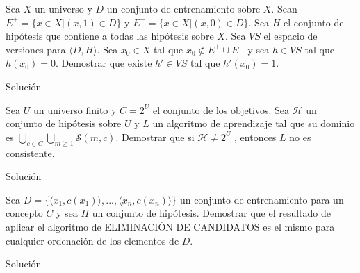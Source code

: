 \documentclass{mulcia_aa}
\begin{document}
\genTitle

\begin{problem}
Sea $X$ un universo y $D$ un conjunto de entrenamiento sobre $X$. Sean $E^+ = \{ x \in X |(x, 1) \in D \}$ y $E^- = \{x \in X |(x, 0) \in D\}$. Sea $H$ el conjunto de hipótesis que contiene a todas las hipótesis sobre $X$. Sea $VS$ el espacio de versiones para $ \langle D, H \rangle$. Sea $x_0 \in X$ tal que $x_0 \not\in E^+ \cup E^- $ y sea $h \in VS$ tal que $h(x_0) = 0$. Demostrar que existe $h' \in VS$ tal que $h'(x_0) = 1$.
\end{problem}
\begin{solution}
Solución
\end{solution}

\begin{problem}
Sea $U$ un universo finito y $C = 2^U$ el conjunto de los objetivos. Sea $\mathcal{H}$ un conjunto de hipótesis sobre $U$ y $L$ un algoritmo de aprendizaje tal que su dominio es $\bigcup_{c \in C}\bigcup_{m \geq 1} \mathcal{S}(m, c)$. Demostrar que si $\mathcal{H} \not= 2^U$ , entonces $L$ no es consistente.
\end{problem}
\begin{solution}
Solución
\end{solution}

\begin{problem}
Sea $D = \{\langle x_1, c(x_1)\rangle, . . . ,\langle x_n, c(x_n)\rangle\}$ un conjunto de entrenamiento para un concepto $C$ y sea $H$ un conjunto de hipótesis. Demostrar que el resultado de aplicar el algoritmo de ELIMINACIÓN DE CANDIDATOS es el mismo para cualquier ordenación de los elementos de $D$.
\end{problem}
 \begin{solution}
Solución
\end{solution}
\end{document}
